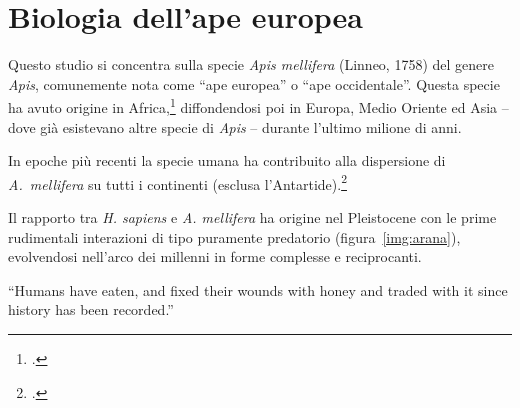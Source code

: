 \chapter{Biologia dell'ape europea}
\label{chap:bio}
Questo studio si concentra sulla specie \emph{Apis mellifera} (Linneo, 1758) del genere \emph{Apis},
comunemente nota come ``ape europea'' o ``ape occidentale''.
Questa specie ha avuto origine in Africa,\footcite{origins}
diffondendosi poi in Europa, Medio Oriente ed Asia -- dove già esistevano altre specie di \emph{Apis} --
durante l'ultimo milione di anni.

In epoche più recenti la specie umana ha contribuito alla dispersione di \emph{A.~mellifera} su tutti i continenti
(esclusa l'Antartide).\footcite{origins,honeyreligion}

Il rapporto tra \emph{H. sapiens} e \emph{A. mellifera} ha origine nel Pleistocene con le prime rudimentali interazioni
di tipo puramente predatorio (figura~\ref{img:arana}), evolvendosi nell'arco dei millenni in forme complesse e reciprocanti.

\begin{displayquote}
``Humans have eaten, and fixed their wounds with honey and traded with it since history has been recorded.''
\end{displayquote}

